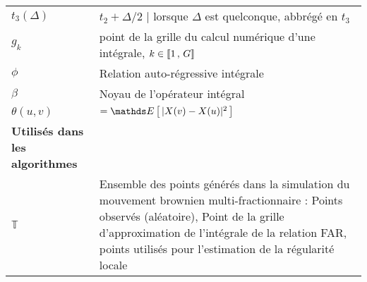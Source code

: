 \begin{table}[H]
\begin{tabularx}{\textwidth}{lX}
		$t_3(\Delta)$     & $t_2 + \Delta/2$ | lorsque $\Delta$ est quelconque, abbrégé en $t_3$                                                                                                                                                                                    \\
		$g_k$             & point de la grille du calcul numérique d'une intégrale, $k \in \llbracket 1 \, , \, G \rrbracket$                                                                                                                                                                       \\
		\midrule
		$\phi$            & Relation auto-régressive intégrale                                                                                                                                                                                                                      \\
		$\beta$           & Noyau de l'opérateur intégral                                                                                                                                                                                                                           \\
		\midrule
		$\theta(u,v)$     & $= \esperance{ |X(v) - X(u)|^2 }$                                                                                                                                                                                                                       \\
		\toprule
		\textbf{Utilisés dans les algorithmes}                                                                                                                                                                                                                                      \\
		\midrule
		$\mathds T$       & Ensemble des points générés dans la simulation du mouvement brownien multi-fractionnaire : Points observés (aléatoire), Point de la grille d'approximation de l'intégrale de la relation FAR, points utilisés pour l'estimation de la régularité locale \\
		\bottomrule
	\end{tabularx}
\end{table}

